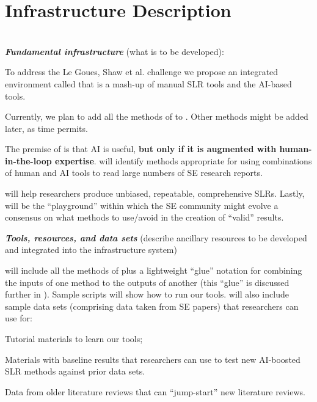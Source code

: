 \vspace{6pt}
\section{Infrastructure Description}
~\\
\noindent
{\bf {\em Fundamental infrastructure}} (what is to be developed):
\bi
\item
To address the Le  Goues,  Shaw  et  al. challenge we  propose   an integrated environment called {\IT} that is a
 mash-up of manual SLR tools
and the AI-based tools.

Currently, we plan to add all the methods of  to {\IT}. Other methods might be added later, as time permits.


The premise of {\IT} is that AI is useful,  {\bf but only if it is augmented
with human-in-the-loop expertise}.
{\IT} will  identify methods
appropriate for using combinations of human and AI tools to read  large numbers of SE research reports.  

{\IT}  will help researchers produce unbiased, repeatable, comprehensive SLRs. Lastly, {\IT} will be the ``playground'' within which the SE community might evolve
a consensus on what methods to use/avoid in the creation of ``valid'' results.
\ei
\ei 
 
\noindent
{\bf {\em  Tools, resources, and data sets}} (describe ancillary resources to be developed and integrated into the infrastructure system)
\bi
\item
 {\IT} will include all the methods of 
 plus a lightweight ``glue''
 notation for combining the inputs
 of one method to the outputs of another (this ``glue''
 is discussed further in ). Sample
 {\IT} scripts will show how  to run our tools.
 {\IT} will also include  sample data sets (comprising data taken from SE papers) that researchers can use for:
\be
\item Tutorial materials to   learn our tools;
\item  Materials with baseline results that researchers can use to test
new AI-boosted SLR methods against prior data sets.
\item Data  from older literature reviews that can  
  ``jump-start'' new literature reviews.
\ee


